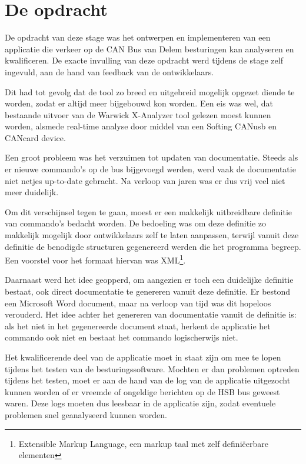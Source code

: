 \chapter{De opdracht}
\label{opdracht}

De opdracht van deze stage was het ontwerpen en implementeren van een applicatie die verkeer op de CAN Bus van Delem besturingen kan analyseren en kwalificeren. De exacte invulling van deze opdracht werd tijdens de stage zelf ingevuld, aan de hand van feedback van de ontwikkelaars.

Dit had tot gevolg dat de tool zo breed en uitgebreid mogelijk opgezet diende te worden, zodat er altijd meer bijgebouwd kon worden. Een eis was wel, dat bestaande uitvoer van de Warwick X-Analyzer tool gelezen moest kunnen worden, alsmede real-time analyse door middel van een Softing CANusb en CANcard device.

Een groot probleem was het verzuimen tot updaten van documentatie. Steeds als er nieuwe commando's op de bus bijgevoegd werden, werd vaak de documentatie niet netjes up-to-date gebracht. Na verloop van jaren was er dus vrij veel niet meer duidelijk.

Om dit verschijnsel tegen te gaan, moest er een makkelijk uitbreidbare definitie van commando's bedacht worden. De bedoeling was om deze definitie zo makkelijk mogelijk door ontwikkelaars zelf te laten aanpassen, terwijl vanuit deze definitie de benodigde structuren gegenereerd werden die het programma begreep. Een voorstel voor het formaat hiervan was XML\footnote{Extensible Markup Language, een markup taal met zelf defini\"eerbare elementen}.

Daarnaast werd het idee geopperd, om aangezien er toch een duidelijke definitie bestaat, ook direct documentatie te genereren vanuit deze definitie. Er bestond een Microsoft Word document, maar na verloop van tijd was dit hopeloos verouderd. Het idee achter het genereren van documentatie vanuit de definitie is: als het niet in het gegenereerde document staat, herkent de applicatie het commando ook niet en bestaat het commando logischerwijs niet.

Het kwalificerende deel van de applicatie moet in staat zijn om mee te lopen tijdens het testen van de besturingssoftware. Mochten er dan problemen optreden tijdens het testen, moet er aan de hand van de log van de applicatie uitgezocht kunnen worden of er vreemde of ongeldige berichten op de HSB bus geweest waren. Deze logs moeten dus leesbaar in de applicatie zijn, zodat eventuele problemen snel geanalyseerd kunnen worden.


